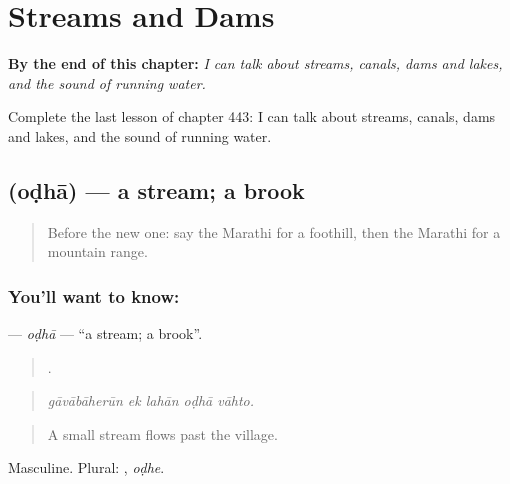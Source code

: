 
\chapter{Streams and Dams}
\label{ch:mr-streams-and-dams}

\begin{chapteropening}
\textbf{By the end of this chapter:} \emph{I can talk about streams, canals, dams and lakes, and the sound of running water.}

Complete the last lesson of chapter 443: I can talk about streams, canals, dams and lakes, and the sound of running water.
\end{chapteropening}

\section[\texorpdfstring{\mr{ओढा} (oḍhā)}{ओढा (oḍhā)}]{ (oḍhā) — a stream; a brook}

\label{lesson:MR-C443-odha}



\begin{quote}
Before the new one: say the Marathi for a foothill, then the Marathi for a mountain range.
\end{quote}

\subsection*{You'll want to know: }
\textbf{} — \emph{oḍhā} — \textquotedblleft{}a stream; a brook\textquotedblright{}.

\begin{quote}
    .
\end{quote}

\begin{quote}
\emph{gāvābāherūn ek lahān oḍhā vāhto.}
\end{quote}

\begin{quote}
A small stream flows past the village.
\end{quote}

Masculine. Plural: , \emph{oḍhe}.

